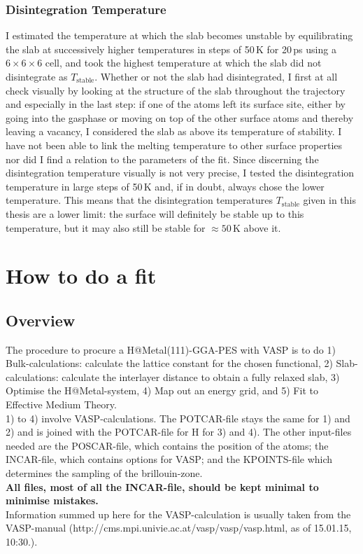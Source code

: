 \documentclass[twoside, 11pt, titlepage, captions=nooneline, a4paper, headsepline]{scrbook}%
\begin{document}
\subsection{Disintegration Temperature}
I estimated the temperature at which the slab becomes unstable by equilibrating the slab at successively higher temperatures in steps of 50\,K for 20\,ps using a $6\times6\times6$ cell, and took the highest temperature at which the slab did not disintegrate as $T_\mathrm{stable}$. Whether or not the slab had disintegrated, I first at all check visually by looking at the structure of the slab throughout the trajectory and especially in the last step: if one of the atoms left its surface site, either by going into the gasphase or moving on top of the other surface atoms and thereby leaving a vacancy, I considered the slab as above its temperature of stability. I have not been able to link the melting temperature to other surface properties nor did I find a relation to the parameters of the fit. Since discerning the disintegration temperature visually is not very precise, I tested the disintegration temperature in large steps of 50\,K and, if in doubt, always chose the lower temperature. This means that the disintegration temperatures $T_\mathrm{stable}$ given in this thesis are a lower limit: the surface will definitely be stable up to this temperature, but it may also still be stable for $\approx 50$\,K above it. 



\chapter{How to do a fit}
\section*{Overview}
The procedure to procure a H@Metal(111)-GGA-PES with VASP is to do 1) Bulk-calculations: calculate the lattice constant for the chosen functional, 2) Slab-calculations: calculate the interlayer distance to obtain a fully relaxed slab, 3) Optimise the H@Metal-system, 4) Map out an energy grid, and 5) Fit to Effective Medium Theory.\\
1) to 4) involve VASP-calculations. The POTCAR-file stays the same for 1) and 2) and is joined with the POTCAR-file for H for 3) and 4). The other input-files needed are the POSCAR-file, which contains the position of the atoms; the INCAR-file, which contains options for VASP; and the KPOINTS-file which determines the sampling of the brillouin-zone.\\
\textbf{All files, most of all the INCAR-file, should be kept minimal to minimise mistakes.}\\
Information summed up here for the VASP-calculation is usually taken from the VASP-manual (http://cms.mpi.univie.ac.at/vasp/vasp/vasp.html, as of 15.01.15, 10:30.).
\end{document}

